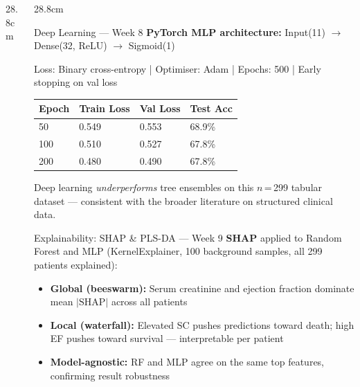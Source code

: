 \documentclass[final]{beamer}
\begin{document}
\begin{frame}[t]{}
\begin{columns}[t, totalwidth=119.2cm]
\begin{column}{28.8cm}
\end{column}

\begin{column}{28.8cm}

\begin{block}{Deep Learning — Week 8}
  \textbf{PyTorch MLP architecture:}
  Input(11) $\to$ Dense(32, ReLU) $\to$ Sigmoid(1)

  \medskip
  Loss: Binary cross-entropy \enspace|\enspace
  Optimiser: Adam \enspace|\enspace
  Epochs: 500 \enspace|\enspace
  Early stopping on val loss

  \medskip
  \setlength{\tabcolsep}{6pt}
  \renewcommand{\arraystretch}{1.35}
  \begin{tabularx}{\linewidth}{@{}XXXX@{}}
    \toprule
    \textbf{Epoch} & \textbf{Train Loss} & \textbf{Val Loss} & \textbf{Test Acc} \\
    \midrule
    50  & 0.549 & 0.553 & 68.9\% \\
    100 & 0.510 & 0.527 & 67.8\% \\
    200 & 0.480 & 0.490 & 67.8\% \\
    \bottomrule
  \end{tabularx}

  \medskip
  Deep learning \emph{underperforms} tree ensembles on this
  $n$\,=\,299 tabular dataset — consistent with the broader
  literature on structured clinical data.
\end{block}

\begin{block}{Explainability: SHAP \& PLS-DA — Week 9}
  \textbf{SHAP} applied to Random Forest and MLP
  (KernelExplainer, 100 background samples, all 299 patients
  explained):

  \medskip
  \begin{itemize}
    \item \textbf{Global (beeswarm):} Serum creatinine and
          ejection fraction dominate mean $|\text{SHAP}|$
          across all patients
    \item \textbf{Local (waterfall):} Elevated SC pushes
          predictions toward death; high EF pushes toward
          survival — interpretable per patient
    \item \textbf{Model-agnostic:} RF and MLP agree on the
          same top features, confirming result robustness
  \end{itemize}


\end{block}
\end{column}
\end{columns}
\end{frame}
\end{document}
